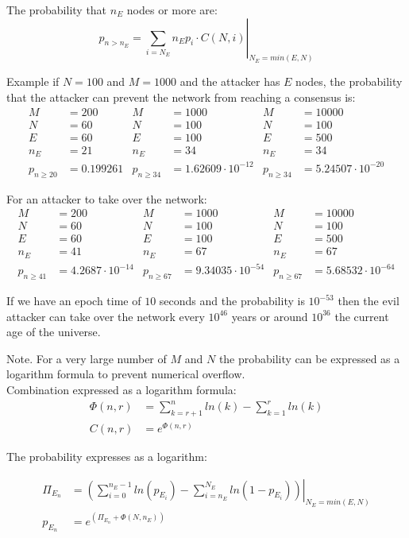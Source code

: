 The probability that $n_E$ nodes or more are:
\begin{equation}
 p_{n>n_E} = \left. \sum_{i=N_E}{n_E}{p_i \cdot C(N,i)} \right|_{N_E = min(E,N)}
\end{equation}


Example if $N=100$ and $M=1000$ and the attacker has $E$ nodes, the probability that the attacker can prevent the network from reaching a consensus is:
\begin{align*}
 M &= 200 & M &= 1000 & M &= 10000 \\
 N &= 60 & N &= 100 & N &= 100 \\
 E &= 60 & E &= 100 & E &= 500 \\
 n_E &= 21 & n_E &= 34 & n_E &= 34 \\
 p_{n \ge 20 } &= 0.199261 & p_{n \ge 34} &= 1.62609 \cdot 10^{-12} & p_{n \ge 34} &= 5.24507 \cdot 10^{-20}
\end{align*}

For an attacker to take over the network:
\begin{align*}
 M &= 200 & M &= 1000 & M &= 10000 \\
 N &= 60 & N &= 100 & N &= 100 \\
 E &= 60 & E &= 100 & E &= 500 \\
 n_E &= 41 & n_E &= 67 & n_E &= 67 \\
 p_{n \ge 41 } &= 4.2687 \cdot 10^{-14} & p_{n \ge 67} &= 9.34035 \cdot 10^{-54} & p_{n \ge 67} &= 5.68532 \cdot 10^{-64}
\end{align*}


If we have an epoch time of $10$ seconds and the probability is $10^{-53}$ then the evil attacker can take over the network every $10^{46}$ years or around $10^{36}$ the current age of the universe.

Note.
For a very large number of $M$ and $N$ the probability can be expressed as a logarithm formula to prevent numerical overflow.\\
Combination expressed as a logarithm formula:
\begin{align*}
 \Phi (n,r) &= \sum_{k=r+1}^{n}{ln(k)} - \sum_{k=1}^{r}{ln(k)} \\
 C(n,r) &= e^{{\Phi}(n,r)}
\end{align*}


The probability expresses as a logarithm:

\begin{align*}
{\Pi}_{E_n} &= \left. \left( \sum_{i=0}^{n_E-1}{ln(p_{E_i})} - \sum_{i=n_E}^{N_E}{ln(1-p_{E_i})} \right) 
\right|_{N_E = min(E,N)} \\
p_{E_n} &= e^{({\Pi}_{E_n}+\Phi(N,n_E))}
\end{align*}


